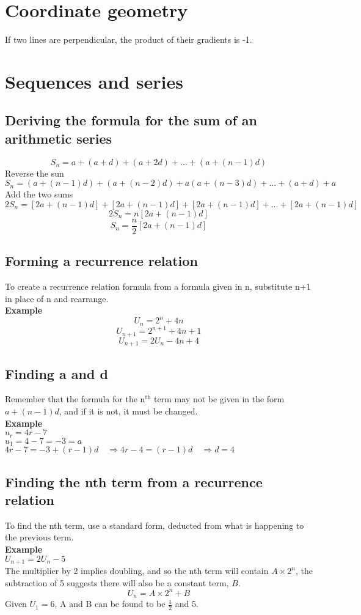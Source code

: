 \documentclass{article}[18pt]
\begin{document}
\section{Coordinate geometry}
If two lines are perpendicular, the product of their gradients is -1.
\section{Sequences and series}
\subsection{Deriving the formula for the sum of an arithmetic series}
$$S_n=a+(a+d)+(a+2d)+...+(a+(n-1)d)$$
Reverse the sun
$$S_n=(a+(n-1)d)+(a+(n-2)d)+a(a+(n-3)d)+...+(a+d)+a$$
Add the two sums
$$2S_n=[2a+(n-1)d]+[2a+(n-1)d]+[2a+(n-1)d]+...+[2a+(n-1)d]$$
$$2S_n=n[2a+(n-1)d]$$
$$S_n=\frac{n}{2}[2a+(n-1)d]$$
\subsection{Forming a recurrence relation}
To create a recurrence relation formula from a formula given in n, substitute n+1 in place of n and rearrange.\\
\textbf{Example}
$$U_n=2^n+4n$$
$$U_{n+1}=2^{n+1}+4{n+1}$$
$$U_{n+1}=2U_n-4n+4$$
\subsection{Finding a and d}
Remember that the formula for the $\textrm{n}^\textrm{th}$ term may not be given in the form $a+(n-1)d$, and if it is not, it must be changed.\\
\textbf{Example}\\
$u_r=4r-7$\\
$u_1=4-7=-3=a$\\
$4r-7=-3+(r-1)d \quad \Rightarrow 4r-4=(r-1)d \quad \Rightarrow d=4$
\subsection{Finding the nth term from a recurrence relation}
To find the nth term, use a standard form, deducted from what is happening to the previous term.\\
\textbf{Example}\\
$U_{n+1}=2U_n-5$\\
The multiplier by 2 implies doubling, and so the nth term will contain $A\times2^n$, the subtraction of 5 suggests there will also be a constant term, $B$.\\
$$U_n=A\times2^n+B$$
Given $U_1=6$, A and B can be found to be $\frac{1}{2}$ and 5.
\end{document}
